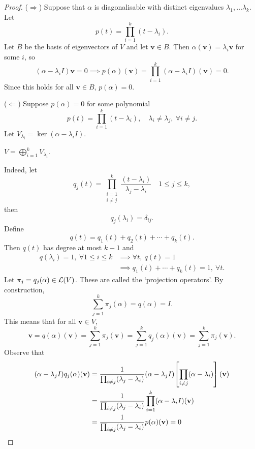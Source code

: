\documentclass[a4paper,11pt]{article}
\begin{document}
\begin{proof}
	($ \Rightarrow $) Suppose that $\alpha$ is diagonalisable with distinct eigenvalues $ \lambda_1,\dots \lambda_k $. Let
	\[
		p(t)= \prod_{i=1}^k (t - \lambda_i). 
	\]
	Let $ B $ be the basis of eigenvectors of $V$ and let $ \mathbf{v}\in B $. Then $\alpha(\mathbf{v}) = \lambda_i \mathbf{v}$ for some $i$, so 
	\[
		(\alpha - \lambda_i I) \mathbf{v} = 0 \implies p(\alpha)(\mathbf{v}) = \prod_{i=1}^k (\alpha - \lambda_i I) (\mathbf{v}) = 0. 
	\]
	Since this holds for all $\mathbf{v}\in B$, $ p(\alpha) = 0. $

	($ \Leftarrow $) Suppose $ p(\alpha) = 0 $ for some polynomial 
	\[
		p(t) = \prod_{i=1}^k (t - \lambda_i), \quad \lambda_i\neq \lambda_j,\ \forall i\neq j. 
	\]
	Let $ V_{\lambda_i} = \ker(\alpha - \lambda_i I) $. 
	\begin{claim}
		$\displaystyle V = \bigoplus_{i=1}^{k} V_{\lambda_i}$. 
	\end{claim}
	Indeed, let 
	\[
		q_{j}(t) = \prod_{\substack{i = 1 \\ i\neq j}}^{k} \frac{(t-\lambda_i)}{\lambda_j-\lambda_i}\quad 1\le j\le k,
	\]
	then 
	\[
		q_j (\lambda_i) = \delta_{ij}. 
	\]
	Define 
	\[
		q(t) = q_{1}(t) + q_2(t) + \cdots + q_k(t). 
	\]
	Then $q(t)$ has degree at most $k-1$ and 
	\begin{align*}
		q(\lambda_i) = 1,\ \forall 1\le i\le k &\implies \forall t,\ q(t) = 1\\ 
		& \implies q_1(t)+\cdots + q_k(t) = 1, \ \forall t. 
	\end{align*}
	Let $ \pi_j = q_j ( \alpha)\in {\mathcal{L}}(V) $. These are called the `projection operators'. By construction, 
	\[
		\sum_{j=1}^{k} \pi_j(\alpha) = q(\alpha) = I. 
	\]
	This means that for all $ \mathbf{v}\in V $, 
	\[
		\mathbf{v} = q(\alpha) (\mathbf{v}) = \sum_{j=1}^{k} \pi_j(\mathbf{v}) = \sum_{j=1}^{k} q_j(\alpha)(\mathbf{v}) =\sum_{j=1}^{k} \pi_j(\mathbf{v}) . 
	\]
	Observe that 
	\begin{align*}
		(\alpha - \lambda_j I) q_j(\alpha)({\bf v}) & = \frac{1}{\prod_{i \neq j} (\lambda_j - \lambda_i)} (\alpha - \lambda_j I) \qty[\prod_{i \neq j} (\alpha - \lambda_i)] (\mathbf{v}) \\
		                                      & = \frac{1}{\prod_{i \neq j} (\lambda_j - \lambda_i)} \prod_{i=1}^k (\alpha - \lambda_i I)({\bf v})                                \\
		                                      & = \frac{1}{\prod_{i \neq j} (\lambda_j - \lambda_i)} p(\alpha)({\bf v}) = 0
	\end{align*}

\end{proof}
\end{document}
